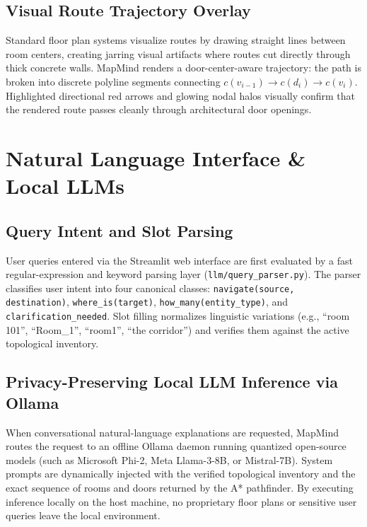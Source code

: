 \documentclass[conference]{IEEEtran}
\begin{document}
\subsection{Visual Route Trajectory Overlay}
Standard floor plan systems visualize routes by drawing straight lines between room centers, creating jarring visual artifacts where routes cut directly through thick concrete walls. MapMind renders a door-center-aware trajectory: the path is broken into discrete polyline segments connecting $c(v_{i-1}) \to c(d_i) \to c(v_i)$. Highlighted directional red arrows and glowing nodal halos visually confirm that the rendered route passes cleanly through architectural door openings.

\section{Natural Language Interface \& Local LLMs}

\subsection{Query Intent and Slot Parsing}
User queries entered via the Streamlit web interface are first evaluated by a fast regular-expression and keyword parsing layer (\texttt{llm/query\_parser.py}). The parser classifies user intent into four canonical classes: \texttt{navigate(source, destination)}, \texttt{where\_is(target)}, \texttt{how\_many(entity\_type)}, and \texttt{clarification\_needed}. Slot filling normalizes linguistic variations (e.g., ``room 101'', ``Room\_1'', ``room1'', ``the corridor'') and verifies them against the active topological inventory.

\subsection{Privacy-Preserving Local LLM Inference via Ollama}
When conversational natural-language explanations are requested, MapMind routes the request to an offline Ollama daemon running quantized open-source models (such as Microsoft Phi-2, Meta Llama-3-8B, or Mistral-7B). System prompts are dynamically injected with the verified topological inventory and the exact sequence of rooms and doors returned by the A* pathfinder. By executing inference locally on the host machine, no proprietary floor plans or sensitive user queries leave the local environment.
\end{document}
